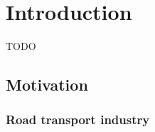 
\chapter{Introduction}

TODO


\section{Motivation}



\subsection{Road transport industry}

% 
% 
% 

